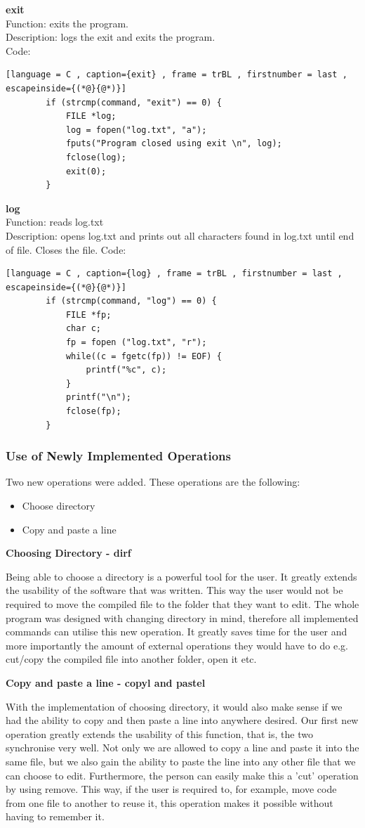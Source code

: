 \documentclass[a4paper]{article}
\theoremstyle{plain}
\theoremstyle{definition}
\theoremstyle{remark}
\begin{document}
\textbf{exit} \\
Function: exits the program. \\
Description: logs the exit and exits the program. \\
Code:
\begin{lstlisting}[language = C , caption={exit} , frame = trBL , firstnumber = last , escapeinside={(*@}{@*)}]
		if (strcmp(command, "exit") == 0) {
			FILE *log;
			log = fopen("log.txt", "a");
			fputs("Program closed using exit \n", log);
			fclose(log);
			exit(0);
		}
\end{lstlisting}

\textbf{log} \\
Function: reads log.txt \\
Description: opens log.txt and prints out all characters found in log.txt until end of file. Closes the file.
Code:
\begin{lstlisting}[language = C , caption={log} , frame = trBL , firstnumber = last , escapeinside={(*@}{@*)}]
		if (strcmp(command, "log") == 0) {
			FILE *fp; 
			char c;
   			fp = fopen ("log.txt", "r");
			while((c = fgetc(fp)) != EOF) {
				printf("%c", c); 
			}
			printf("\n");
			fclose(fp);
		}
\end{lstlisting}
\subsubsection{Use of Newly Implemented Operations}
Two new operations were added. These operations are the following:
\begin{itemize}
	\item Choose directory
	\item Copy and paste a line	
\end{itemize}
\textbf{Choosing Directory - dirf}
\begin{flushleft}
	Being able to choose a directory is a powerful tool for the user. It greatly extends the usability of the software that was written. This way the user would not be required to move the compiled file to the folder that they want to edit. The whole program was designed with changing directory in mind, therefore all implemented commands can utilise this new operation. It greatly saves time for the user and more importantly the amount of external operations they would have to do e.g. cut/copy the compiled file into another folder, open it etc.
\end{flushleft}
\textbf{Copy and paste a line - copyl and pastel}
\begin{flushleft}
With the implementation of choosing directory, it would also make sense if we had the ability to copy and then paste a line into anywhere desired. Our first new operation greatly extends the usability of this function, that is, the two synchronise very well. Not only we are allowed to copy a line and paste it into the same file, but we also gain the ability to paste the line into any other file that we can choose to edit. Furthermore, the person can easily make this a 'cut' operation by using remove. This way, if the user is required to, for example, move code from one file to another to reuse it, this operation makes it possible without having to remember it. 
\end{flushleft}
\end{document}
